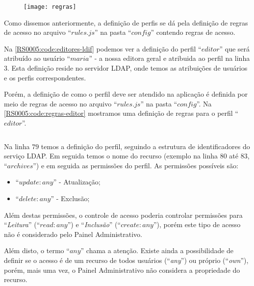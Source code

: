 \begin{figure}[!ht]
    \centering
    \texttt{[image: regras]}
\end{figure}

Como dissemos anteriormente, a definição de perfis se dá pela definição de regras de acesso no arquivo ``$rules.js$'' na pasta ``$config$'' contendo regras de acesso.

Na \cref{RS0005:code:editores-ldif} podemos ver a definição do perfil ``$editor$'' que será atribuído ao usuário ``$maria$'' - a nossa editora geral e atribuida ao perfil na linha $3$. Esta definição reside no servidor \gls{LDAP}, onde temos as atribuições de usuários e os perfis correspondentes.

Porém, a definição de como o perfil deve ser atendido na aplicação é definida por meio de regras de acesso no arquivo ``$rules.js$'' na pasta ``$config$''. Na \cref{RS0005:code:regras-editor} mostramos uma definição de regras para o perfil ``$editor$''.

\begin{code}
    \inputminted[xleftmargin=20pt,fontsize=\footnotesize,breaklines,breakanywhere,linenos=true,label=rules.json,firstline=79,lastline=138]{JavaScript}{../RS0005/anexos/rules.js}
    \caption{Exemplo de regras de controle de acesso}\label{RS0005:code:regras-editor}
\end{code}

Na linha $79$ temos a definição do perfil, seguindo a estrutura de identificadores do serviço \gls{LDAP}. Em seguida temos o nome do recurso (exemplo na linha $80$ até $83$, ``$archives$'') e em seguida as permissões do perfil. As permissões possíveis são:

\begin{itemize}
    \item ``\textbf{$update:any$}'' - Atualização;
    \item ``\textbf{$delete:any$}'' - Exclusão;
\end{itemize}

Além destas permissões, o controle de acesso poderia controlar permissões para ``\textit{Leitura}'' (``\textbf{$read:any$}'') e ``\textit{Inclusão}'' (``\textbf{$create:any$}''), porém este tipo de acesso não é considerado pelo Painel Administrativo.

Além disto, o termo ``\textbf{$any$}'' chama a atenção. Existe ainda a possibilidade de definir se o acesso é de um recurso de todos usuários (``\textit{any}'') ou próprio (``\textit{own}''), porém, mais uma vez, o Painel Administrativo não considera a propriedade do recurso.

